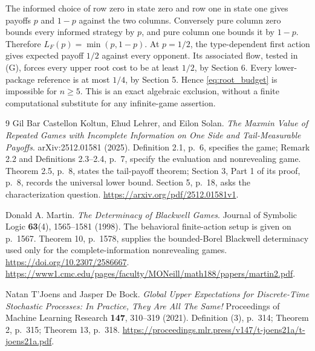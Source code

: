 \documentclass[11pt,a4paper]{article}
\begin{document}
The informed choice of row zero in state zero and row one in state one gives payoffs \(p\) and \(1-p\) against the two columns. Conversely pure column zero bounds every informed strategy by \(p\), and pure column one bounds it by \(1-p\). Therefore \(L_F(p)=\min(p,1-p)\). At \(p=1/2\), the type-dependent first action gives expected payoff \(1/2\) against every opponent. Its associated flow, tested in (G), forces every upper root cost to be at least \(1/2\), by Section 6. Every lower-package reference is at most \(1/4\), by Section 5. Hence \eqref{eq:root_budget} is impossible for \(n\ge5\). This is an exact algebraic exclusion, without a finite computational substitute for any infinite-game assertion.

\begin{thebibliography}{9}
Gil Bar Castellon Koltun, Ehud Lehrer, and Eilon Solan.
\emph{The Maxmin Value of Repeated Games with Incomplete Information on
One Side and Tail-Measurable Payoffs}. arXiv:2512.01581 (2025).
Definition 2.1, p.~6, specifies the game; Remark 2.2 and Definitions 2.3--2.4,
p.~7, specify the evaluation and nonrevealing game. Theorem 2.5, p.~8,
states the tail-payoff theorem; Section 3, Part 1 of its proof, p.~8, records
the universal lower bound. Section 5, p.~18, asks the characterization question.
\url{https://arxiv.org/pdf/2512.01581v1}.

Donald A. Martin. \emph{The Determinacy of Blackwell Games}.
Journal of Symbolic Logic \textbf{63}(4), 1565--1581 (1998).
The behavioral finite-action setup is given on p.~1567. Theorem 10,
p.~1578, supplies the bounded-Borel Blackwell determinacy used only for the
complete-information nonrevealing games.
\url{https://doi.org/10.2307/2586667}.
\url{https://www1.cmc.edu/pages/faculty/MONeill/math188/papers/martin2.pdf}.

Natan T'Joens and Jasper De Bock.
\emph{Global Upper Expectations for Discrete-Time Stochastic Processes:
In Practice, They Are All The Same!}
Proceedings of Machine Learning Research \textbf{147}, 310--319 (2021).
Definition (3), p.~314; Theorem 2, p.~315; Theorem 13, p.~318.
\url{https://proceedings.mlr.press/v147/t-joens21a/t-joens21a.pdf}.
\end{thebibliography}
\end{document}
